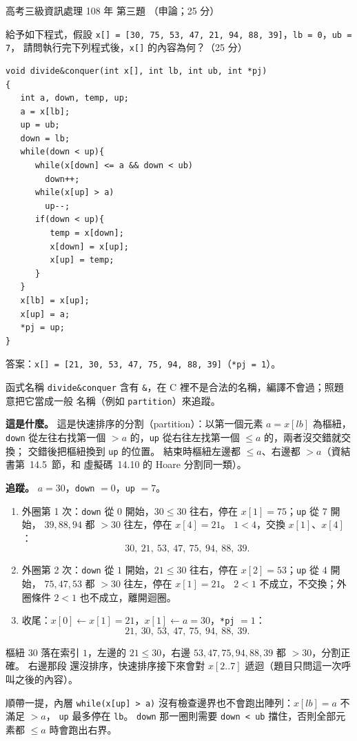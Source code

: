 \begin{pastexam}[label={px:gk3-108-ds-03}]{高考三級資訊處理 108 年 第三題}
（申論；25 分）

給予如下程式，假設 \texttt{x[] = [30, 75, 53, 47, 21, 94, 88, 39]}，\texttt{lb = 0}，\texttt{ub = 7}，
請問執行完下列程式後，\texttt{x[]} 的內容為何？（25 分）
\begin{verbatim}
void divide&conquer(int x[], int lb, int ub, int *pj)
{
   int a, down, temp, up;
   a = x[lb];
   up = ub;
   down = lb;
   while(down < up){
      while(x[down] <= a && down < ub)
        down++;
      while(x[up] > a)
        up--;
      if(down < up){
         temp = x[down];
         x[down] = x[up];
         x[up] = temp;
      }
   }
   x[lb] = x[up];
   x[up] = a;
   *pj = up;
}
\end{verbatim}
\end{pastexam}

\begin{pastsoln}
答案：\texttt{x[] = [21, 30, 53, 47, 75, 94, 88, 39]}（\texttt{*pj = 1}）。

函式名稱 \texttt{divide\&conquer} 含有 \texttt{\&}，在 C 裡不是合法的名稱，編譯不會過；照題意把它當成一般
名稱（例如 \texttt{partition}）來追蹤。

\textbf{這是什麼。} 這是快速排序的分割（partition）：以第一個元素 $a = x[\mathit{lb}]$ 為樞紐，
\texttt{down} 從左往右找第一個 $> a$ 的，\texttt{up} 從右往左找第一個 $\le a$ 的，兩者沒交錯就交換；
交錯後把樞紐換到 \texttt{up} 的位置。 結束時樞紐左邊都 $\le a$、右邊都 $> a$（資結書第~14.5~節，和
虛擬碼~14.10 的 Hoare 分割同一類）。

\textbf{追蹤。} $a = 30$，\texttt{down} $= 0$，\texttt{up} $= 7$。
\begin{enumerate}
\item 外圈第 1 次：\texttt{down} 從 $0$ 開始，$30 \le 30$ 往右，停在 $x[1] = 75$；\texttt{up} 從 $7$ 開始，
$39, 88, 94$ 都 $> 30$ 往左，停在 $x[4] = 21$。 $1 < 4$，交換 $x[1]$、$x[4]$：
\[
30,\ 21,\ 53,\ 47,\ 75,\ 94,\ 88,\ 39.
\]
\item 外圈第 2 次：\texttt{down} 從 $1$ 開始，$21 \le 30$ 往右，停在 $x[2] = 53$；\texttt{up} 從 $4$ 開始，
$75, 47, 53$ 都 $> 30$ 往左，停在 $x[1] = 21$。 $2 < 1$ 不成立，不交換；外圈條件 $2 < 1$ 也不成立，離開迴圈。
\item 收尾：$x[0] \gets x[1] = 21$，$x[1] \gets a = 30$，\texttt{*pj} $= 1$：
\[
21,\ 30,\ 53,\ 47,\ 75,\ 94,\ 88,\ 39.
\]
\end{enumerate}
樞紐 $30$ 落在索引 $1$，左邊的 $21 \le 30$，右邊 $53, 47, 75, 94, 88, 39$ 都 $> 30$，分割正確。 右邊那段
還沒排序，快速排序接下來會對 $x[2..7]$ 遞迴（題目只問這一次呼叫之後的內容）。

順帶一提，內層 \texttt{while(x[up] > a)} 沒有檢查邊界也不會跑出陣列：$x[\mathit{lb}] = a$ 不滿足 $> a$，
\texttt{up} 最多停在 \texttt{lb}。 \texttt{down} 那一圈則需要 \texttt{down < ub} 擋住，否則全部元素都
$\le a$ 時會跑出右界。
\end{pastsoln}
